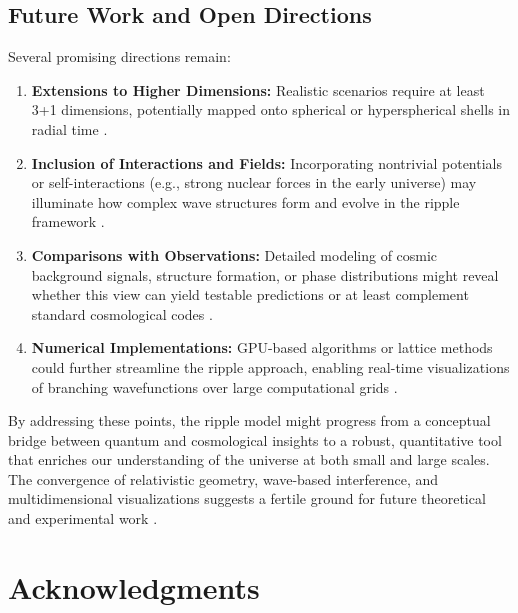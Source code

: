 \documentclass{article}
\begin{document}
\subsection{Future Work and Open Directions}
\label{subsec:future-work}
Several promising directions remain:
\begin{enumerate}
  \item \textbf{Extensions to Higher Dimensions:} Realistic scenarios 
        require at least 3+1 dimensions, potentially mapped onto spherical 
        or hyperspherical shells in radial time \cite{Penrose1979, susskind2008}.
  \item \textbf{Inclusion of Interactions and Fields:} Incorporating 
        nontrivial potentials or self-interactions (e.g., strong nuclear 
        forces in the early universe) may illuminate how complex wave 
        structures form and evolve in the ripple framework \cite{kolbTurner1990, nielsenchuang2000}.
  \item \textbf{Comparisons with Observations:} Detailed modeling of 
        cosmic background signals, structure formation, or phase 
        distributions might reveal whether this view can yield 
        testable predictions or at least complement standard 
        cosmological codes \cite{hawking1988, carroll2010}.
  \item \textbf{Numerical Implementations:} GPU-based algorithms 
        or lattice methods could further streamline the ripple 
        approach, enabling real-time visualizations of branching 
        wavefunctions over large computational grids \cite{schleich2001quantum, husimi1940some}.
\end{enumerate}
By addressing these points, the ripple model might progress from a 
conceptual bridge between quantum and cosmological insights 
to a robust, quantitative tool that enriches our understanding 
of the universe at both small and large scales. The convergence of 
relativistic geometry, wave-based interference, and multidimensional 
visualizations suggests a fertile ground for future theoretical 
and experimental work \cite{penrose2004, susskind2008}.

\section{Acknowledgments}
\label{sec:acknowledgments}
\end{document}
